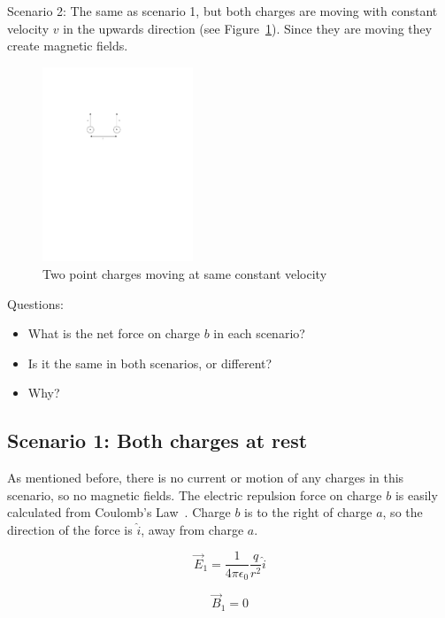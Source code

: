\documentclass[a4paper]{article}
\theoremstyle{plain}
\theoremstyle{definition}
\newcommand{\vect}[1]{\vec{#1}}
\newcommand{\hatvec}[1]{\hat{#1}}
\newcommand{\ihat}{\hatvec{i}}
\begin{document}
Scenario 2: The same as scenario 1, but both charges are moving with
constant velocity $v$ in the upwards direction (see
Figure~\ref{fig:two-charges-moving}).  Since they are moving they
create magnetic fields.

\begin{figure}[ht]
	\centering
	\includegraphics[width=0.4\textwidth]{two-charges-moving-cropped.pdf}
	\caption{Two point charges moving at same constant velocity}
	\label{fig:two-charges-moving}
\end{figure}

Questions:
\begin{itemize}
  \item What is the net force on charge $b$ in each scenario?
  \item Is it the same in both scenarios, or different?
  \item Why?
\end{itemize}


\subsection{Scenario 1: Both charges at rest}

As mentioned before, there is no current or motion of any charges in
this scenario, so no magnetic fields.  The electric repulsion force on
charge $b$ is easily calculated from Coulomb's Law~\cite{CoulombsLaw}.
Charge $b$ is to the right of charge $a$, so the direction of the force is
$\ihat$, away from charge $a$.

\begin{equation}
\vect{E}_1 = \frac{1}{4 \pi \epsilon_0} \frac{q}{r^2} \ihat \label{eq:E1}
\end{equation}

\begin{equation}
\vect{B}_1 = 0
\end{equation}
\end{document}
